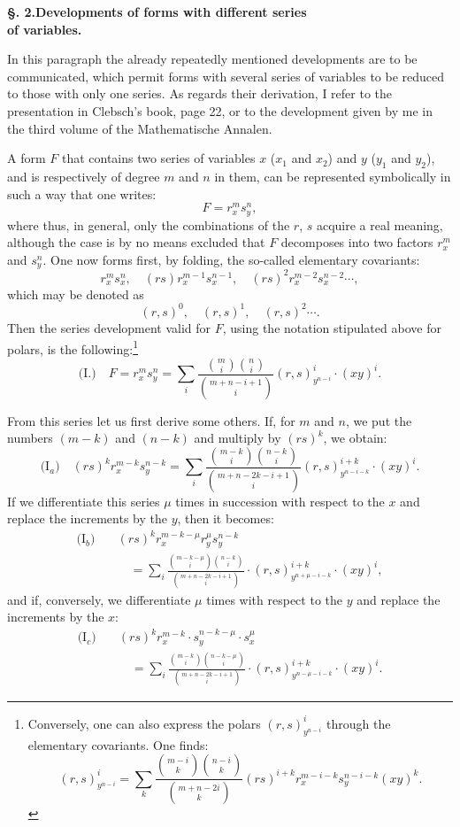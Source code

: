 \documentclass[10pt]{article}
\begin{document}
\begin{center}
{\bfseries §. 2.\quad Developments of forms with different series\\ of variables.}
\end{center}

In this paragraph the already repeatedly mentioned developments are to be communicated, which permit forms with several series of variables to be reduced to those with only one series. As regards their derivation, I refer to the presentation in Clebsch's book, page 22, or to the development given by me in the third volume of the Mathematische Annalen.

A form $F$ that contains two series of variables $x$ ($x_1$ and $x_2$) and $y$ ($y_1$ and $y_2$), and is respectively of degree $m$ and $n$ in them, can be represented symbolically in such a way that one writes:
\[
F=r_x^m s_y^n,
\]
where thus, in general, only the combinations of the $r$, $s$ acquire a real meaning, although the case is by no means excluded that $F$ decomposes into two factors $r_x^m$ and $s_y^n$. One now forms first, by folding, the so-called elementary covariants:
\[
r_x^m s_x^n,\quad (rs)r_x^{m-1}s_x^{n-1},\quad (rs)^2 r_x^{m-2}s_x^{n-2}\cdots,
\]
which may be denoted as
\[
(r,s)^0,\quad (r,s)^1,\quad (r,s)^2\cdots.
\]
Then the series development valid for $F$, using the notation stipulated above for polars, is the following:\footnote{Conversely, one can also express the polars $(r,s)^i_{y^{n-i}}$ through the elementary covariants. One finds:
\[
(r,s)^i_{y^{n-i}}=\sum_k\frac{\binom{m-i}{k}\binom{n-i}{k}}{\binom{m+n-2i}{k}}(rs)^{i+k}r_x^{m-i-k}s_y^{n-i-k}(xy)^k.
\]}
\[
\text{(I.)}\quad F=r_x^m s_y^n=\sum_i\frac{\binom{m}{i}\binom{n}{i}}{\binom{m+n-i+1}{i}}(r,s)^i_{y^{n-i}}\cdot(xy)^i.
\]

From this series let us first derive some others. If, for $m$ and $n$, we put the numbers $(m-k)$ and $(n-k)$ and multiply by $(rs)^k$, we obtain:
\[
\text{(I$_a$)}\quad (rs)^k r_x^{m-k}s_y^{n-k}=\sum_i\frac{\binom{m-k}{i}\binom{n-k}{i}}{\binom{m+n-2k-i+1}{i}}(r,s)^{i+k}_{y^{n-i-k}}\cdot(xy)^i.
\]
If we differentiate this series $\mu$ times in succession with respect to the $x$ and replace the increments by the $y$, then it becomes:
\[
\begin{aligned}
\text{(I$_b$)}\quad &(rs)^k r_x^{m-k-\mu}r_y^\mu s_y^{n-k} \\
&\quad =\sum_i\frac{\binom{m-k-\mu}{i}\binom{n-k}{i}}{\binom{m+n-2k-i+1}{i}}\cdot (r,s)^{i+k}_{y^{n+\mu-i-k}}\cdot (xy)^i,
\end{aligned}
\]
and if, conversely, we differentiate $\mu$ times with respect to the $y$ and replace the increments by the $x$:
\[
\begin{aligned}
\text{(I$_c$)}\quad &(rs)^k r_x^{m-k}\cdot s_y^{n-k-\mu}\cdot s_x^\mu \\
&\quad =\sum_i\frac{\binom{m-k}{i}\binom{n-k-\mu}{i}}{\binom{m+n-2k-i+1}{i}}\cdot (r,s)^{i+k}_{y^{n-\mu-i-k}}\cdot (xy)^i.
\end{aligned}
\]
\end{document}
